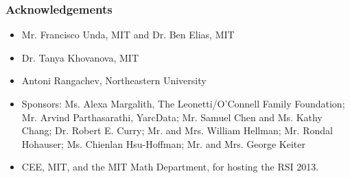 \documentclass[pdf]{beamer}
\def\ii{\item}
\begin{document}
%
%
%

\begin{frame}
	\frametitle{Acknowledgements}
	\begin{itemize}
		\ii \alert{Mr. Francisco Unda}, MIT and \alert{Dr. Ben Elias}, MIT
		\ii \alert{Dr. Tanya Khovanova}, MIT
		\ii \alert{Antoni Rangachev}, Northeastern University
		\ii \alert{Sponsors}: Ms. Alexa Margalith, The Leonetti/O'Connell Family Foundation; Mr. Arvind Parthasarathi, YarcData; Mr. Samuel Chen and Ms. Kathy Chang; Dr. Robert E. Curry; Mr. and Mrs. William Hellman; Mr. Rondal Hohauser; Ms. Chienlan Hsu-Hoffman; Mr. and Mrs. George Keiter
		\ii \alert{CEE}, \alert{MIT}, and the \alert{MIT Math Department}, for hosting the \alert{RSI 2013}.
	\end{itemize}
\end{frame}
\end{document}
